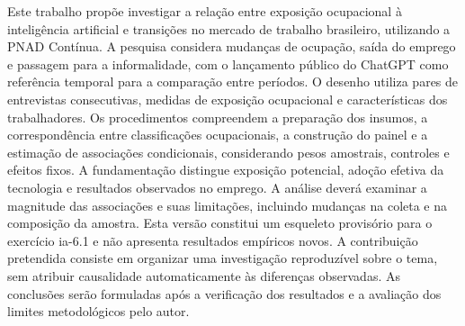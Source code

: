 \begin{resumo}
Este trabalho propõe investigar a relação entre exposição ocupacional à inteligência artificial e transições no mercado de trabalho brasileiro, utilizando a PNAD Contínua. A pesquisa considera mudanças de ocupação, saída do emprego e passagem para a informalidade, com o lançamento público do ChatGPT como referência temporal para a comparação entre períodos. O desenho utiliza pares de entrevistas consecutivas, medidas de exposição ocupacional e características dos trabalhadores. Os procedimentos compreendem a preparação dos insumos, a correspondência entre classificações ocupacionais, a construção do painel e a estimação de associações condicionais, considerando pesos amostrais, controles e efeitos fixos. A fundamentação distingue exposição potencial, adoção efetiva da tecnologia e resultados observados no emprego. A análise deverá examinar a magnitude das associações e suas limitações, incluindo mudanças na coleta e na composição da amostra. Esta versão constitui um esqueleto provisório para o exercício ia-6.1 e não apresenta resultados empíricos novos. A contribuição pretendida consiste em organizar uma investigação reproduzível sobre o tema, sem atribuir causalidade automaticamente às diferenças observadas. As conclusões serão formuladas após a verificação dos resultados e a avaliação dos limites metodológicos pelo autor.
\end{resumo}